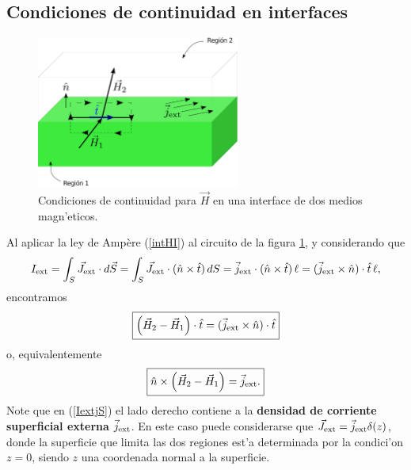 \subsection{Condiciones de continuidad en interfaces}
\begin{figure}[!h]
\centerline{\includegraphics[height=5cm]{fig/fig-condicion-borde-magnetica-01.pdf}}
\caption{Condiciones de continuidad para $\vec{H}$ en una interface de dos
medios magn'eticos.}
\label{BM1}
\end{figure}
Al aplicar la ley de Amp\`ere (\ref{intHI}) al circuito de la figura \ref{BM1},
y considerando que
\begin{equation}\label{IextjS}
 I_{\rm ext}=\int_S\vec{J}_{\rm ext}\cdot d\vec{S}=\int_S\vec{J}_{\rm ext}\cdot
(\hat{n}\times\hat{t})\,dS=\vec{j}_{\rm ext}\cdot
(\hat{n}\times\hat{t})\,\ell=(\vec{j}_{\rm ext}\times\hat{n})\cdot\hat{t}\,\ell ,
\end{equation}
encontramos
\begin{equation}
 \boxed{\left(\vec{H}_2-\vec{H}_1\right)\cdot\hat{t}=(\vec{j}_{\rm
ext}\times\hat{n})\cdot\hat{t}} \label{Hint}
\end{equation}
o, equivalentemente
\begin{equation}
\boxed{\hat{n}\times\left(\vec{H}_2-\vec{H}_1\right)=\vec{j}_{\rm
ext}.}
\end{equation}
Note que en (\ref{IextjS}) el lado derecho contiene a la \textbf{densidad de corriente superficial externa} $\vec{j}_{\rm ext}$. En este caso puede considerarse que $\vec{J}_{\rm ext}=\vec{j}_{\rm ext}\delta(z)$, donde la superficie que limita las dos regiones est'a determinada por la condici'on $z=0$, siendo $z$ una coordenada normal a la superficie.

